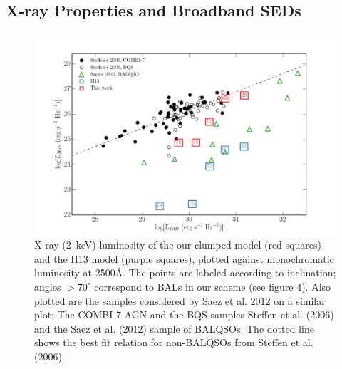 \documentclass[preprint, a4paper, 11pt]{aastex}
\providecommand{\DIFdelbegin}{} %
\providecommand{\DIFdelend}{} %
\providecommand{\DIFaddbeginFL}{} %
\providecommand{\DIFaddendFL}{} %
\providecommand{\DIFdelbeginFL}{} %
\providecommand{\DIFdelendFL}{} %
\begin{document}
\subsection{X-ray Properties and Broadband SEDs}
\DIFdelbegin %
\DIFdelend 

\begin{figure} %
\centering
\DIFdelbeginFL %
\DIFdelendFL \DIFaddbeginFL \includegraphics[width=1.0\textwidth]{figures/lx.png}
\DIFaddendFL \caption
{
X-ray ($2$~keV) luminosity of the our clumped model (red squares) 
and the H13 model (purple squares), plotted against monochromatic luminosity 
at 2500\AA. The points are labeled according to inclination; angles
$>70^\circ$ correspond to BALs in our scheme (see figure 4).
Also plotted are the samples considered by Saez et al. 2012 on a similar plot; 
The COMBI-7 AGN and the BQS samples Steffen et al. (2006) and the Saez et al. (2012) 
sample of BALQSOs. The dotted line shows the best fit relation for non-BALQSOs 
from Steffen et al. (2006).
}
\label{fig:xray}
\end{figure} %




\DIFdelbegin %
\end{document}
